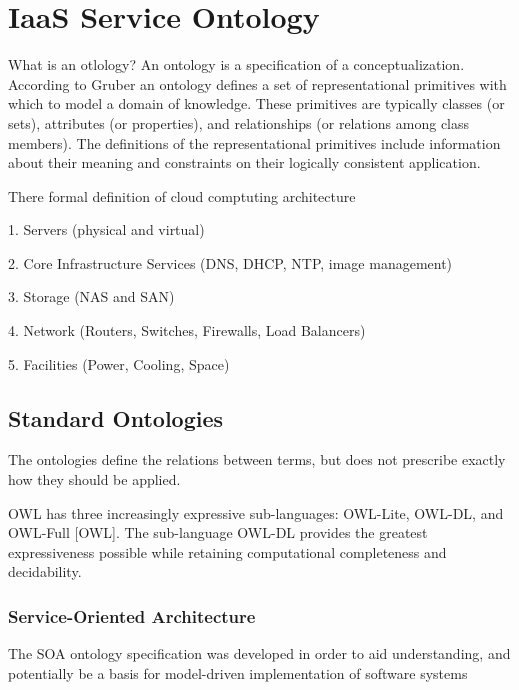 
\section{IaaS Service Ontology}

What is an otlology? An ontology is a specification of a conceptualization. According to Gruber \cite{OntologyDefinition} an ontology defines a set of representational primitives with which to model a domain of knowledge. These  primitives are typically classes (or sets), attributes (or properties), and relationships (or relations among class members). The definitions of the representational primitives include information about their meaning and constraints on their logically consistent application.




There formal definition of cloud comptuting architecture 

1. Servers (physical and virtual)

2. Core Infrastructure Services (DNS, DHCP, NTP, image management)

3. Storage (NAS and SAN)

4. Network (Routers, Switches, Firewalls, Load Balancers)

5. Facilities (Power, Cooling, Space)

\subsection{Standard Ontologies}

The ontologies define the relations between terms, but does not prescribe exactly how they should be applied. 

OWL has three increasingly expressive sub-languages: OWL-Lite, OWL-DL, and OWL-Full [OWL]. The sub-language OWL-DL provides the greatest expressiveness possible while retaining computational completeness and decidability.

\subsubsection{Service-Oriented Architecture}

The SOA ontology specification was developed in order to aid understanding, and potentially be a basis for model-driven implementation of software systems

